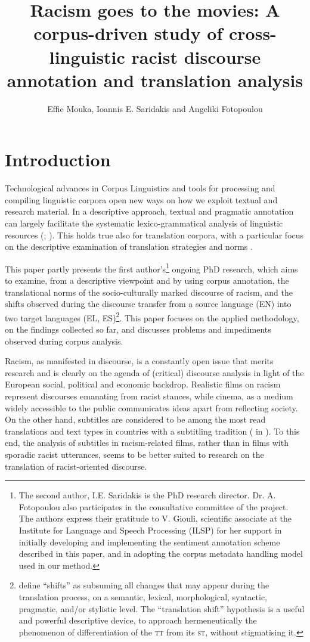 \documentclass[output=paper]{LSP/langsci}
\author{Effie Mouka, Ioannis E. Saridakis and Angeliki Fotopoulou}
\title{Racism goes to the movies: A corpus-driven study of cross-linguistic racist discourse annotation and translation analysis}
\begin{document}
\section{Introduction} \label{sec:2:1}
Technological advances in Corpus Linguistics and tools for processing and compiling linguistic corpora open new ways on how we exploit textual and research material. In a descriptive approach, textual and pragmatic annotation can largely facilitate the systematic lexico-grammatical analysis of linguistic resources (\citealt[29-31]{EneryHardie2012}; \citealt[76-79]{Zanettin2012}). This holds true also for translation corpora, with a particular focus on the descriptive examination of translation strategies and norms \citep[78-96]{Zanettin2012}.

This paper partly presents the first author's\footnote{The second author, I.E. Saridakis is the PhD research director. Dr. A. Fotopoulou also participates in the consultative committee of the project. The authors express their gratitude to V. Giouli, scientific associate at the Institute for Language and Speech Processing (ILSP) for her support in initially developing and implementing the sentiment annotation scheme described in this paper, and in adopting the corpus metadata handling model used in our method.} ongoing PhD research, which aims to examine, from a descriptive viewpoint and by using corpus annotation, the translational norms of the socio-culturally marked discourse of racism, and the shifts observed during the discourse transfer from a source language (EN) into two target languages (EL, ES)\footnote{\citet[120-121]{Batsalia2010} define “shifts” as subsuming all changes that may appear during the translation process, on a semantic, lexical, morphological, syntactic, pragmatic, and/or stylistic level. The “translation shift” hypothesis is a useful and powerful descriptive device, to approach hermeneutically the phenomenon of differentiation of the \textsc{tt} from its \textsc{st}, without stigmatising it.}. This paper focuses on the applied methodology, on the findings collected so far, and discusses problems and impediments observed during corpus analysis.

Racism, as manifested in discourse, is a constantly open issue that merits research \citep{Dijk1993,Reisigl2001} and is clearly on the agenda of (critical) discourse analysis in light of the European social, political and economic backdrop. Realistic films on racism represent discourses emanating from racist stances, while cinema, as a medium widely accessible to the public communicates ideas apart from reflecting society. On the other hand, subtitles are considered to be among the most read translations and text types in countries with a subtitling tradition (\citealt[153]{Gottlieb1997} in \citealt[125]{Pedersen2011}). To this end, the analysis of subtitles in racism-related films, rather than in films with sporadic racist utterances, seems to be better suited to research on the translation of racist-oriented discourse.
\end{document}
